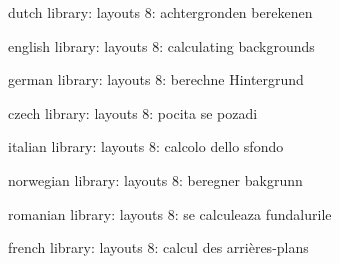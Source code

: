 


\unprotect

\startmessages  dutch  library: layouts
      8: achtergronden berekenen
\stopmessages

\startmessages  english  library: layouts
      8: calculating backgrounds
\stopmessages

\startmessages  german  library: layouts
      8: berechne Hintergrund
\stopmessages

\startmessages  czech  library: layouts
      8: pocita se pozadi
\stopmessages

\startmessages  italian  library: layouts
      8: calcolo dello sfondo
\stopmessages

\startmessages  norwegian  library: layouts
      8: beregner bakgrunn
\stopmessages

\startmessages  romanian  library: layouts
      8: se calculeaza fundalurile
\stopmessages

\startmessages  french  library: layouts
      8: calcul des arrières-plans
\stopmessages


\newif\ifnewbackground
\newif\ifsomebackground


\appendtoks
  \ifsomebackground \ifnewbackground \setsystemmode\v!background \fi \fi
\to \everybeforepagebody


